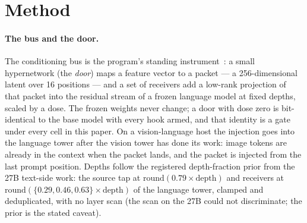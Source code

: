 \documentclass[11pt]{article}
\begin{document}
\section{Method}\label{sec:method}

\paragraph{The bus and the door.} The conditioning bus is the
program's standing instrument~\cite{penov2026act,penov2026want}: a
small hypernetwork (the \emph{door}) maps a feature vector to a packet
--- a 256-dimensional latent over 16 positions --- and a set of
receivers add a low-rank projection of that packet into the residual
stream of a frozen language model at fixed depths, scaled by a dose. The
frozen weights never change; a door with dose zero is bit-identical to
the base model with every hook armed, and that identity is a gate under
every cell in this paper. On a vision-language host the injection goes
into the language tower after the vision tower has done its work: image
tokens are already in the context when the packet lands, and the packet
is injected from the last prompt position. Depths follow the registered
depth-fraction prior from the 27B text-side work: the source tap at
$\mathrm{round}(0.79\times\text{depth})$ and receivers at
$\mathrm{round}(\{0.29, 0.46, 0.63\}\times\text{depth})$ of the language
tower, clamped and deduplicated, with no layer scan (the scan on the 27B
could not discriminate; the prior is the stated caveat).
\end{document}
